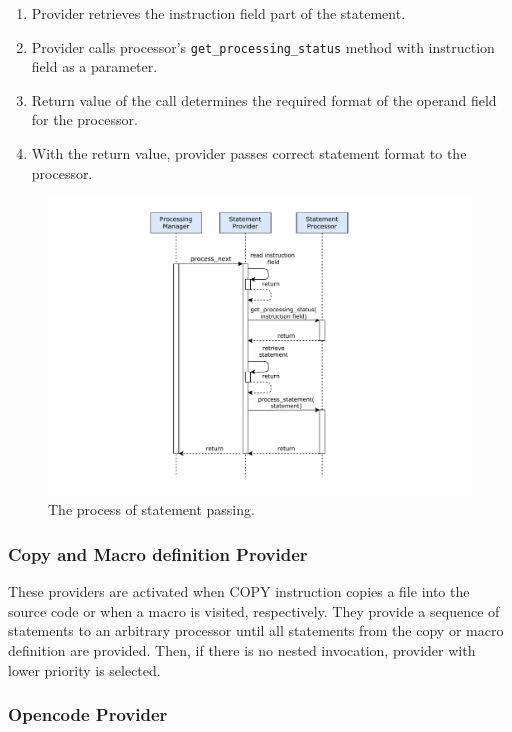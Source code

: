 \begin{enumerate}
	\item Provider retrieves the instruction field part of the statement.
	\item Provider calls processor's \texttt{get\_processing\_status} method with instruction field as a parameter.
	\item Return value of the call determines the required format of the operand field for the processor.
	\item With the return value, provider passes correct statement format to the processor. 
\end{enumerate}

\begin{figure}
	\centering
	\includegraphics[width=13cm]{img/process_next}
	\caption{The process of statement passing.}
	\label{fig06:process_next}
\end{figure}


\subsubsection{Copy and Macro definition Provider}

These providers are activated when COPY instruction copies a file into the source code or when a macro is visited, respectively. They provide a sequence of statements to an arbitrary processor until all statements from the copy or macro definition are provided. Then, if there is no nested invocation, provider with lower priority is selected.

\subsubsection{Opencode Provider}


